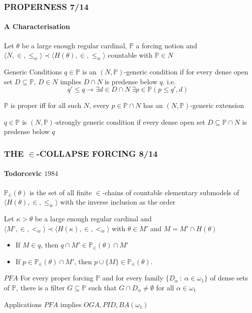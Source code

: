 \documentclass{beamer}
\begin{document}
\begin{frame}
\frametitle{PROPERNESS \hspace{76.8mm}7/14}
\framesubtitle{A Characterisation}
Let $\theta$ be a large enough regular cardinal, $\mathbb{P}$ a forcing notion and $\langle N, \in, \leq_w \rangle \prec \langle H(\theta), \in, \leq_w \rangle $ countable with $\mathbb{P} \in N $
\begin{block}{Generic Conditions}
$q \in \mathbb{P}$ is an $(N, \mathbb{P})$-generic condition if for every dense open set $D \subseteq \mathbb{P}$, $D \in N$ implies $D \cap N$ is predense below $q$. i.e.
$$q' \leq q \longrightarrow \exists d \in D \cap N \ \exists p \in \mathbb{P}(p \leq q', d)$$
\end{block}
\begin{block}{}
$\mathbb{P}$ is proper iff for all such $N$, every $p \in \mathbb{P} \cap N$ has an $(N, \mathbb{P})$-generic extension
\end{block}
$q \in \mathbb{P}$ is $(N, \mathbb{P})$-strongly generic condition if every dense open set $D \subseteq \mathbb{P} \cap N$ is predense below $q$
\end{frame}
\begin{frame}
\frametitle{THE $\in$-COLLAPSE FORCING \hspace{41.5mm}8/14}
\framesubtitle{Todorcevic $1984$}
\vspace{-2mm}
\begin{block}{}
$\mathbb{P}_{\in}(\theta)$ is the set of all finite $\in$-chains of countable elementary submodels of $\langle H(\theta), \in, \leq_w \rangle $ with the inverse inclusion as the order
\end{block}
\pause
Let $\kappa > \theta$ be a large enough regular cardinal and $\langle M', \in, <_w \rangle \prec \langle H(\kappa), \in, <_w \rangle$ with $\theta \in M'$ and $M=M' \cap H(\theta)$
\begin{itemize}
\item If $M \in q$, then $q \cap M' \in \mathbb{P}_{\in}(\theta) \cap M'$
\item If $p \in \mathbb{P}_{\in}(\theta) \cap M'$, then	$p \cup \{M\} \in \mathbb{P}_{\in}(\theta)$.
\end{itemize}
\pause
\begin{block}{$PFA$}
For every proper forcing $\mathbb{P}$ and for every family $\{D_{\alpha} \ : \ \alpha \in \omega_1\}$ of dense sets of $\mathbb{P}$, there is a filter $G \subseteq \mathbb{P}$ such that $G \cap D_{\alpha} \neq \emptyset$ for all $\alpha \in \omega_1$
\end{block}
\pause
\begin{block}{Applications}
 $PFA$ implies $OGA, PID, BA(\omega_1)$
\end{block}
\end{frame}
\end{document}
